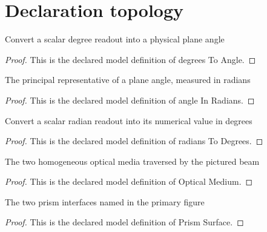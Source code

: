 \section{Declaration topology}
\begin{definition}
  \label{def:physics:phyx-mini-0016:phyxminiproblems-problemphyxmini0016-degreestoangle}
  Convert a scalar degree readout into a physical plane angle
\end{definition}
\begin{proof}
  This is the declared model definition of degrees To Angle.
\end{proof}
\begin{definition}
  \label{def:physics:phyx-mini-0016:phyxminiproblems-problemphyxmini0016-angleinradians}
  The principal representative of a plane angle, measured in radians
\end{definition}
\begin{proof}
  This is the declared model definition of angle In Radians.
\end{proof}
\begin{definition}
  \label{def:physics:phyx-mini-0016:phyxminiproblems-problemphyxmini0016-radianstodegrees}
  Convert a scalar radian readout into its numerical value in degrees
\end{definition}
\begin{proof}
  This is the declared model definition of radians To Degrees.
\end{proof}
\begin{definition}
  \label{def:physics:phyx-mini-0016:phyxminiproblems-problemphyxmini0016-opticalmedium}
  The two homogeneous optical media traversed by the pictured beam
\end{definition}
\begin{proof}
  This is the declared model definition of Optical Medium.
\end{proof}
\begin{definition}
  \label{def:physics:phyx-mini-0016:phyxminiproblems-problemphyxmini0016-prismsurface}
  The two prism interfaces named in the primary figure
\end{definition}
\begin{proof}
  This is the declared model definition of Prism Surface.
\end{proof}
